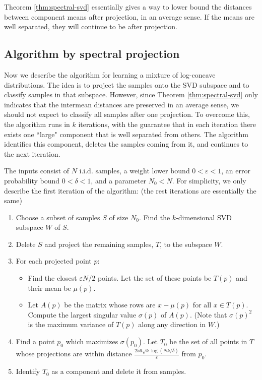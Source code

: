 \documentclass[11pt,letter]{article}
\begin{document}
Theorem \ref{thm:spectral-svd} essentially gives a way to lower bound the distances between component means after projection, in an average sense. If the means are well separated, they will continue to be after projection.


\subsection{Algorithm by spectral projection}

Now we describe the algorithm for learning a mixture of log-concave distributions.
The idea is to project the samples onto the SVD subspace and to classify samples in that subspace. However, since Theorem \ref{thm:spectral-svd} only indicates that the intermean distances are preserved in an average sense, we should not expect to classify all samples after one projection.
To overcome this, the algorithm runs in $k$ iterations, with the guarantee that in each iteration there exists one ``large" component that is well separated from others. The algorithm identifies this component, deletes the samples coming from it, and continues to the next iteration.


The inputs consist of $N$ i.i.d. samples, a weight lower bound $0<\varepsilon<1$, an error probability bound $0<\delta<1$, and a parameter $N_0<N$. For simplicity, we only describe the first iteration of the algorithm: (the rest iterations are essentially the same)
\begin{enumerate}
\item Choose a subset of samples $S$ of size $N_0$. Find the $k$-dimensional SVD subspace $W$ of $S$.
\item Delete $S$ and project the remaining samples, $T$, to the subspace $W$.
\item For each projected point $p$:
\begin{itemize}
\item Find the closest $\varepsilon N/2$ points. Let the set of these points be $T(p)$ and their mean be $\mu(p)$.
\item Let $A(p)$ be the matrix whose rows are $x-\mu(p)$ for all $x\in T(p)$. Compute the largest singular value $\sigma(p)$ of $A(p)$. (Note that $\sigma(p)^2$ is the maximum variance of $T(p)$ along any direction in $W$.)
\end{itemize}
\item Find a point $p_0$ which maximizes $\sigma(p_0)$. Let $T_0$ be the set of all points in $T$ whose projections are within distance $\frac{256\sqrt k \log(Nk/\delta)}{\varepsilon}$ from $p_0$.
\item Identify $T_0$ as a component and delete it from samples.
\end{enumerate}
\end{document}
